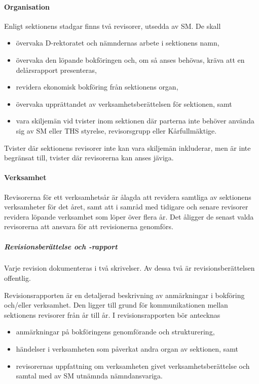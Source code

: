 \documentclass{dgovdoc}
\begin{document}
\paragraph{Organisation}

Enligt sektionens stadgar finns två revisorer, utsedda av SM. De skall

\begin{itemize}
  \item övervaka D-rektoratet och nämndernas arbete i sektionens namn,
  \item övervaka den löpande bokföringen och, om så anses behövas, kräva att en
    delårsrapport presenteras,
  \item revidera ekonomisk bokföring från sektionens organ,
  \item övervaka upprättandet av verksamhetsberättelsen för sektionen, samt
  \item vara skiljemän vid tvister inom sektionen där parterna inte behöver
    använda sig av SM eller THS styrelse, revisorsgrupp eller Kårfullmäktige.
\end{itemize}

Tvister där sektionens revisorer inte kan vara skiljemän inkluderar, men är
inte begränsat till, tvister där revisorerna kan anses jäviga.

\paragraph{Verksamhet}

Revisorerna för ett verksamhetsår är ålagda att revidera samtliga av sektionens
verksamheter för det året, samt att i samråd med tidigare och senare revisorer
revidera löpande verksamhet som löper över flera år. Det åligger de senast
valda revisorerna att ansvara för att revisionerna genomförs.

\subparagraph{Revisionsberättelse och -rapport}

Varje revision dokumenteras i två skrivelser. Av dessa två är
revisionsberättelsen offentlig.

Revisionsrapporten är en detaljerad beskrivning av anmärkningar i bokföring
och/eller verksamhet. Den ligger till grund för kommunikationen mellan
sektionens revisorer från år till år. I
revisionsrapporten bör antecknas

\begin{itemize}
  \item anmärkningar på bokföringens genomförande och strukturering,
  \item händelser i verksamheten som påverkat andra organ av sektionen, samt
  \item revisorernas uppfattning om verksamheten givet verksamhetsberättelse
    och samtal med av SM utnämnda nämndansvariga.
\end{itemize}
\end{document}
